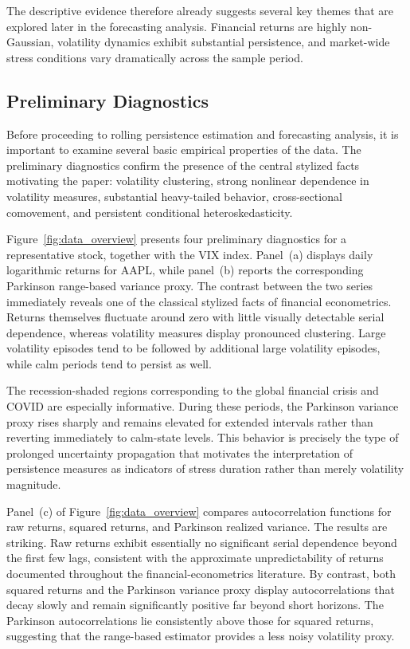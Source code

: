 \documentclass[unnumsec,webpdf,contemporary,large]{oup-authoring-template}%
\theoremstyle{thmstyleone}%
\theoremstyle{thmstyletwo}%
\theoremstyle{thmstylethree}%
\begin{document}
The descriptive evidence therefore already suggests several key themes that
are explored later in the forecasting analysis. Financial returns are
highly non-Gaussian, volatility dynamics exhibit substantial persistence,
and market-wide stress conditions vary dramatically across the sample
period.



\subsection{Preliminary Diagnostics}

Before proceeding to rolling persistence estimation and forecasting
analysis, it is important to examine several basic empirical properties of
the data. The preliminary diagnostics confirm the presence of the central
stylized facts motivating the paper: volatility clustering, strong
nonlinear dependence in volatility measures, substantial heavy-tailed
behavior, cross-sectional comovement, and persistent conditional
heteroskedasticity.

Figure~\ref{fig:data_overview} presents four preliminary diagnostics for a
representative stock, together with the VIX index. Panel~(a) displays
daily logarithmic returns for AAPL, while panel~(b) reports the
corresponding Parkinson range-based variance proxy. The contrast between
the two series immediately reveals one of the classical stylized facts of
financial econometrics. Returns themselves fluctuate around zero with
little visually detectable serial dependence, whereas volatility measures
display pronounced clustering. Large volatility episodes tend to be
followed by additional large volatility episodes, while calm periods tend
to persist as well.

The recession-shaded regions corresponding to the global financial crisis
and COVID are especially informative. During these periods, the Parkinson
variance proxy rises sharply and remains elevated for extended intervals
rather than reverting immediately to calm-state levels. This behavior is
precisely the type of prolonged uncertainty propagation that motivates the
interpretation of persistence measures as indicators of stress duration
rather than merely volatility magnitude.

Panel~(c) of Figure~\ref{fig:data_overview} compares autocorrelation
functions for raw returns, squared returns, and Parkinson realized
variance. The results are striking. Raw returns exhibit essentially no
significant serial dependence beyond the first few lags, consistent with
the approximate unpredictability of returns documented throughout the
financial-econometrics literature. By contrast, both squared returns and
the Parkinson variance proxy display autocorrelations that decay slowly and
remain significantly positive far beyond short horizons. The Parkinson
autocorrelations lie consistently above those for squared returns,
suggesting that the range-based estimator provides a less noisy volatility
proxy.
\end{document}

